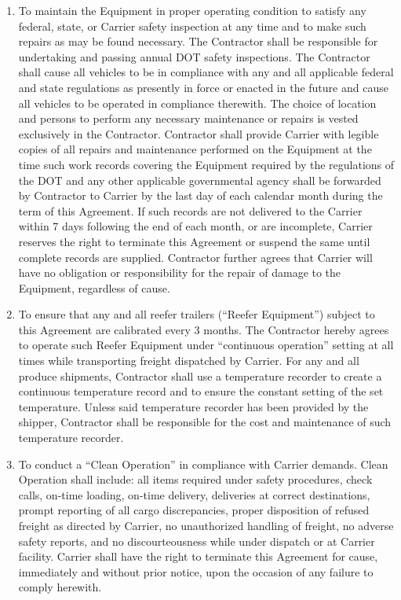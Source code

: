 \begin{enumerate}
    \item To maintain the Equipment in proper operating condition to
    satisfy any federal, state, or Carrier safety inspection at any time
    and to make such repairs as may be found necessary. The Contractor
    shall be responsible for undertaking and passing annual DOT safety
    inspections. The Contractor shall cause all vehicles to be in
    compliance with any and all applicable federal and state regulations as
    presently in force or enacted in the future and cause all vehicles to
    be operated in compliance therewith. The choice of location and persons
    to perform any necessary maintenance or repairs is vested exclusively
    in the Contractor. Contractor shall provide Carrier with legible copies
    of all repairs and maintenance performed on the Equipment at the time
    such work records covering the Equipment required by the regulations of
    the DOT and any other applicable governmental agency shall be forwarded
    by Contractor to Carrier by the last day of each calendar month during
    the term of this Agreement. If such records are not delivered to the
    Carrier within 7 days following the end of each month, or are
    incomplete, Carrier reserves the right to terminate this Agreement or
    suspend the same until complete records are supplied. Contractor
    further agrees that Carrier will have no obligation or responsibility
    for the repair of damage to the Equipment, regardless of cause.

    \item To ensure that any and all reefer trailers (``Reefer Equipment'')
    subject to this Agreement are calibrated every 3 months. The Contractor
    hereby agrees to operate such Reefer Equipment under ``continuous
    operation'' setting at all times while transporting freight dispatched
    by Carrier. For any and all produce shipments, Contractor shall use a
    temperature recorder to create a continuous temperature record and to
    ensure the constant setting of the set temperature. Unless said
    temperature recorder has been provided by the shipper, Contractor shall
    be responsible for the cost and maintenance of such temperature
    recorder.

    \item To conduct a ``Clean Operation'' in compliance with Carrier
    demands. Clean Operation shall include: all items required under safety
    procedures, check calls, on-time loading, on-time delivery, deliveries
    at correct destinations, prompt reporting of all cargo discrepancies,
    proper disposition of refused freight as directed by Carrier, no
    unauthorized handling of freight, no adverse safety reports, and no
    discourteousness while under dispatch or at Carrier facility. Carrier
    shall have the right to terminate this Agreement for cause, immediately
    and without prior notice, upon the occasion of any failure to comply
    herewith.


\end{enumerate}
